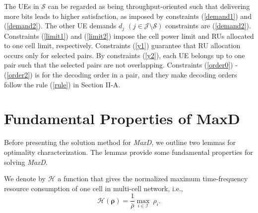 \documentclass[10pt,journal,final,finalsubmission,twocolumn]{IEEEtran}
\begin{document}
The UEs in $\mathcal{S}$ can be regarded as being throughput-oriented such that delivering more bits leads to higher satisfaction, as imposed by constraints (\ref{demand1}) and (\ref{demand2}). The other UE demands $d_j$ $(j \!\in \!\mathcal{J} \!\setminus\mathcal{S})$ constraints are (\ref{demand2}). Constraints (\ref{limit1}) and (\ref{limit2}) impose the cell power limit and RUs allocated to one cell limit, respectively. Constraints (\ref{y1}) guarantee that RU allocation occurs only for selected pairs. By constraints (\ref{y2}), each UE belongs up to one pair such that the selected pairs are not overlapping. Constraints (\ref{order0}) - (\ref{order2}) is for the decoding order in a pair, and they make decoding orders follow the rule (\ref{rule}) in Section II-A. 



\section{Fundamental Properties of MaxD} \label{Sec:properties}

Before presenting the solution method for {\em MaxD}, we outline two lemmas for optimality characterization. The lemmas provide some fundamental properties for solving {\em MaxD}. 


We denote by $\mathcal{H}$ a function that gives the normalized maximum time-frequency resource consumption of one cell in multi-cell network, i.e.,
\begin{equation}
\mathcal{H}(\boldsymbol{\rho}) = \frac{1}{\bar{\rho}}\underset{i\in \mathcal{I}}{\max} \ \rho_i.
\end{equation}
\end{document}
